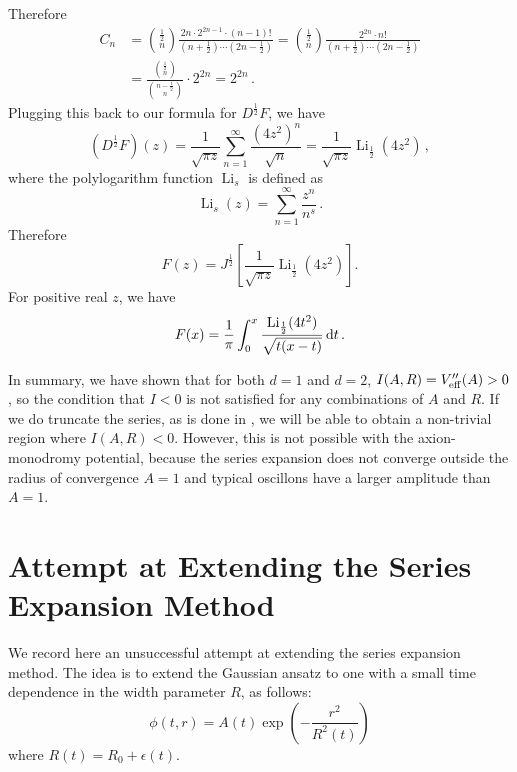 \documentclass[11pt]{book}
\DeclareMathOperator{\Li}{Li}
\begin{document}
Therefore
\begin{equation}
  \begin{split}
    C_n &= \binom{\frac{1}{2}}{n}\frac{2n\cdot 2^{2n-1} \cdot(n-1)!}{\left(n+\frac{1}{2}\right)\cdots\left(2n-\frac{1}{2}\right)} = \binom{\frac{1}{2}}{n}\frac{2^{2n}\cdot n!}{\left(n+\frac{1}{2}\right)\cdots\left(2n-\frac{1}{2}\right)}\\
    &=\frac{\binom{\frac{1}{2}}{n}}{\binom{n-\frac{1}{2}}{n}}\cdot2^{2n} = 2^{2n}\,.
  \end{split}
\end{equation}
Plugging this back to our formula for $D^\frac{1}{2}F$, we have
\begin{equation}
  (D^\frac{1}{2}F)(z) = \frac{1}{\sqrt{\pi z}} \sum^\infty_{n=1} \frac{(4z^2)^n}{\sqrt{n}} = \frac{1}{\sqrt{\pi z}}\Li_{\frac{1}{2}}(4z^2)\,,
\end{equation}
where the polylogarithm function $\Li_s$ is defined as
\begin{equation}
  \Li_s(z) = \sum^\infty_{n=1}\frac{z^n}{n^s}\,.
\end{equation}
Therefore
\begin{equation}
  F(z) = J^\frac{1}{2}\left[\frac{1}{\sqrt{\pi z}}\Li_{\frac{1}{2}}(4z^2)\right].
\end{equation}
For positive real $z$, we have
\begin{equation}
  F(x) = \frac{1}{\pi}\int^x_0\frac{\Li_{\frac{1}{2}}(4t^2)}{\sqrt{t(x-t)}}\,{\rm d}t\,.
\end{equation}

\bigbreak

In summary, we have shown that for both $d=1$ and $d=2$, $I(A,R) = V''_{\rm eff}(A) > 0$, so the condition that $I<0$ is not satisfied for any combinations of $A$ and $R$. If we do truncate the series, as is done in \cite{Gleiser:2008ty}, we will be able to obtain a non-trivial region where $I(A,R)<0$. However, this is not possible with the axion-monodromy potential, because the series expansion does not converge outside the radius of convergence $A = 1$ and typical oscillons have a larger amplitude than $A=1$.

\section{Attempt at Extending the Series Expansion Method}
We record here an unsuccessful attempt at extending the series expansion method. The idea is to extend the Gaussian ansatz to one with a small time dependence in the width parameter $R$, as follows:
\begin{equation}
  \phi(t,r) = A(t) \exp \left(-\frac{r^2}{R^2(t)}\right )
\end{equation}
where $R(t) = R_0 + \epsilon(t)$.
\end{document}
